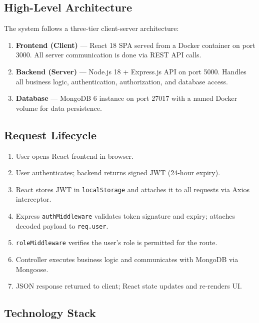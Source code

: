 \documentclass[12pt]{article}
\begin{document}
\subsection{High-Level Architecture}
The system follows a three-tier client-server architecture:

\begin{enumerate}
    \item \textbf{Frontend (Client)} --- React 18 SPA served from a Docker container on port 3000. All server communication is done via REST API calls.
    \item \textbf{Backend (Server)} --- Node.js 18 + Express.js API on port 5000. Handles all business logic, authentication, authorization, and database access.
    \item \textbf{Database} --- MongoDB 6 instance on port 27017 with a named Docker volume for data persistence.
\end{enumerate}

\subsection{Request Lifecycle}
\begin{enumerate}
    \item User opens React frontend in browser.
    \item User authenticates; backend returns signed JWT (24-hour expiry).
    \item React stores JWT in \texttt{localStorage} and attaches it to all requests via Axios interceptor.
    \item Express \texttt{authMiddleware} validates token signature and expiry; attaches decoded payload to \texttt{req.user}.
    \item \texttt{roleMiddleware} verifies the user's role is permitted for the route.
    \item Controller executes business logic and communicates with MongoDB via Mongoose.
    \item JSON response returned to client; React state updates and re-renders UI.
\end{enumerate}

\subsection{Technology Stack}
\end{document}

